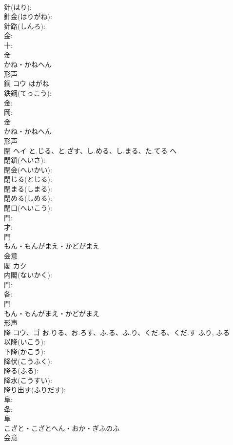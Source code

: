 \documentclass[8pt]{extreport}
\begin{document}
\begin{CJK}{UTF8}{min}
\\	針(はり): 
\\	針金(はりがね): 
\\	針路(しんろ): 
\\	金: 
\\	十: 
\\	金	
\\	かね・かねへん	
\\	形声 
\\	鋼	コウ	はがね		
\\	鉄鋼(てっこう): 
\\	金: 
\\	岡: 
\\	金	
\\	かね・かねへん	
\\	形声 
\\	閉	ヘイ	と.じる、と.ざす、し.める、し.まる、た.てる	へ	
\\	閉鎖(へいさ): 
\\	閉会(へいかい): 
\\	閉じる(とじる): 
\\	閉まる(しまる): 
\\	閉める(しめる): 
\\	閉口(へいこう): 
\\	門: 
\\	才: 
\\	門	
\\	もん・もんがまえ・かどがまえ	
\\	会意 
\\	閣	カク			
\\	内閣(ないかく): 
\\	門: 
\\	各: 
\\	門	
\\	もん・もんがまえ・かどがまえ	
\\	形声 
\\	降	コウ、ゴ	お.りる、お.ろす、ふ.る、ふ.り、くだ.る、くだ.す	ふり, ふる	
\\	以降(いこう): 
\\	下降(かこう): 
\\	降伏(こうふく): 
\\	降る(ふる): 
\\	降水(こうすい): 
\\	降り出す(ふりだす): 
\\	阜: 
\\	夅: 
\\	阜	
\\	こざと・こざとへん・おか・ぎふのふ	
\\	会意 

\end{CJK}
\end{document}
